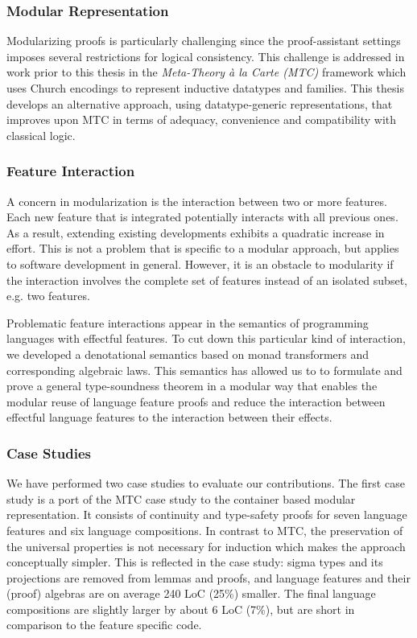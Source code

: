 
\subsubsection{Modular Representation}
Modularizing proofs is particularly challenging since the proof-assistant
settings imposes several restrictions for logical consistency. This challenge is
addressed in work prior to this thesis in the \emph{Meta-Theory \`a la Carte
  (MTC)} \cite{mtc} framework which uses Church encodings to represent inductive
datatypes and families. This thesis develops an alternative approach, using
datatype-generic representations, that improves upon MTC in terms of adequacy,
convenience and compatibility with classical logic.

\subsubsection{Feature Interaction}
A concern in modularization is the interaction between two or more features.
Each new feature that is integrated potentially interacts with all previous
ones. As a result, extending existing developments exhibits a quadratic increase
in effort. This is not a problem that is specific to a modular approach, but
applies to software development in general. However, it is an obstacle to
modularity if the interaction involves the complete set of features instead of
an isolated subset, e.g. two features.

Problematic feature interactions appear in the semantics of programming
languages with effectful features. To cut down this particular kind of
interaction, we developed a denotational semantics based on monad transformers
and corresponding algebraic laws. This semantics has allowed us to to formulate
and prove a general type-soundness theorem in a modular way that enables the
modular reuse of language feature proofs and reduce the interaction between
effectful language features to the interaction between their effects.

\subsubsection{Case Studies}

We have performed two case studies to evaluate our contributions. The first case
study is a port of the MTC case study to the container based modular
representation. It consists of continuity and type-safety proofs for seven
language features and six language compositions. In contrast to MTC, the
preservation of the universal properties is not necessary for induction which
makes the approach conceptually simpler. This is reflected in the case study:
sigma types and its projections are removed from lemmas and proofs, and language
features and their (proof) algebras are on average 240 LoC (25\%) smaller. The
final language compositions are slightly larger by about 6 LoC (7\%), but are
short in comparison to the feature specific code.

